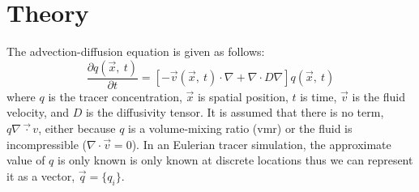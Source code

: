 \documentclass{article}
\begin{document}
\newcommand{\vect}[1]{\ensuremath{\vec #1}}

\section{Theory}

The advection-diffusion equation is given as follows:
\begin{equation}
\frac{\partial q(\vect x, ~ t)}{\partial t} = \left [ -\vect v(\vect x, ~t) \cdot \nabla + \nabla \cdot D \nabla \right ] q(\vect x, ~ t)
\label{advection_diffusion}
\end{equation}
where $q$ is the tracer concentration, $\vect x$ is spatial position, 
$t$ is time, $\vect v$ is the fluid velocity, and $D$ is the diffusivity tensor.
It is assumed that there is no term, $q \nabla \vect \cdot v$,
either because $q$ is a volume-mixing ratio (vmr) or 
the fluid is incompressible ($\nabla \cdot \vec v = 0$).
In an Eulerian tracer simulation, the approximate value of $q$ is only known
is only known at discrete locations thus we can represent it as a vector,
$\vect q=\lbrace q_i \rbrace$.
\end{document}
